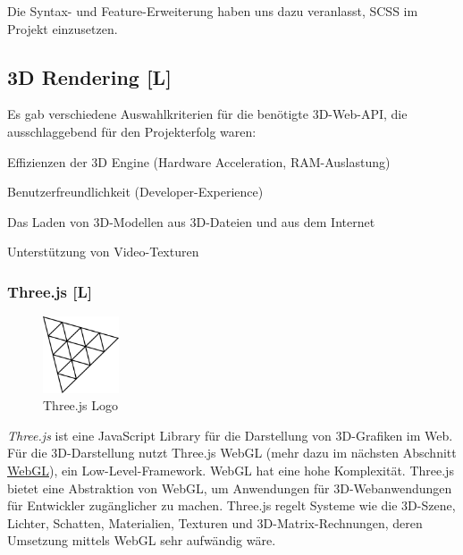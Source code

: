 Die Syntax- und Feature-Erweiterung haben uns dazu veranlasst, SCSS im Projekt einzusetzen.


\subsection{3D Rendering [L]}
Es gab verschiedene Auswahlkriterien für die benötigte 3D-Web-API, die ausschlaggebend für den Projekterfolg waren:
\begin{compactitem}
  \item Effizienzen der 3D Engine (Hardware Acceleration, RAM-Auslastung)
  \item Benutzerfreundlichkeit (Developer-Experience)
  \item Das Laden von 3D-Modellen aus 3D-Dateien und aus dem Internet
  \item Unterstützung von Video-Texturen
\end{compactitem}

\subsubsection{Three.js [L]}
\begin{figure}
    \begin{center}
      \includegraphics[width=0.2\textwidth]{pics/threeJS.png}
     \caption{Three.js Logo}
    \end{center}
\end{figure}
\emph{Three.js} ist eine JavaScript Library für die Darstellung von 3D-Grafiken im Web. Für die 3D-Darstellung nutzt Three.js WebGL (mehr dazu im nächsten Abschnitt \hyperref[ch::webgl]{WebGL}), ein Low-Level-Framework. WebGL hat eine hohe Komplexität. Three.js bietet eine Abstraktion von WebGL, um Anwendungen für 3D-Webanwendungen für Entwickler zugänglicher zu machen.
Three.js regelt Systeme wie die 3D-Szene, Lichter, Schatten, Materialien, Texturen und 3D-Matrix-Rechnungen, deren Umsetzung mittels WebGL sehr aufwändig wäre. \cite{ThreeJsFund}

